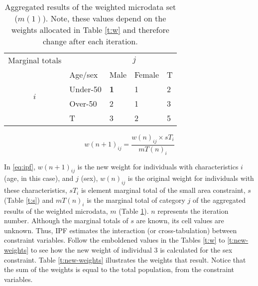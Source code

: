 \documentclass[a4paper,10pt]{article}
\begin{document}
\begin{table}[!htbp]
\caption[The aggregated results of the weighted
microdata set]{Aggregated results of the weighted
microdata set ($m(1)$).
Note, these values depend on the
weights allocated in Table \ref{t:w} and therefore
 change after each iteration.}
\begin{center}
\begin{tabular}{cllll}\toprule
Marginal totals&  & \multicolumn{2}{c}{$j$} & \\
& Age/sex & Male & Female & T\\ \midrule
\multirow{2}{*}{$i$} & Under-50 & \textbf{1} & 1 & 2\\
& Over-50 & 2 & 1 &3 \\
& T & 3 & 2 &5\\
\bottomrule
\end{tabular}
\end{center}
\label{t:m}
\end{table}

\begin{equation}
w(n+1)_{ij} = \frac{w(n)_{ij} \times sT_{i}}{mT(n)_{i}}
\label{eq:ipf}
\end{equation}

In \cref{eq:ipf}, $w(n+1)_{ij}$ is the new weight for individuals with characteristics $i$
(age, in this case), and $j$ (sex),  $w(n)_{ij}$ is the original
weight for individuals with these characteristics, $sT_{i}$ is element
marginal total of the small area constraint, $s$
(Table \ref{t:s}) and $mT(n)_{i}$ is the marginal total of category
$j$ of the aggregated results of the weighted
microdata, $m$ (Table \ref{t:m}). $n$ represents the iteration number.
Although the marginal totals of $s$ are known, its cell values
are unknown. Thus, IPF estimates the interaction (or cross-tabulation)
between constraint variables.
Follow the emboldened values in the Tables \ref{t:w} to \ref{t:new-weights}
to see how the new weight of individual 3 is calculated for the sex constraint.
Table \ref{t:new-weights} illustrates the weights that result. Notice that the
sum of the weights is equal to the total population, from the constraint variables.
\end{document}
